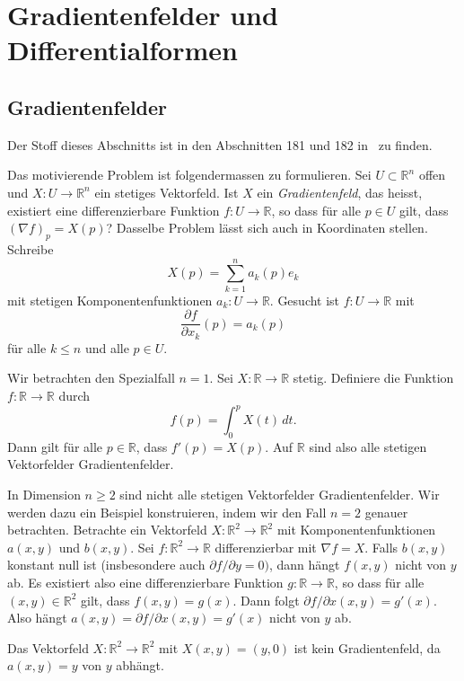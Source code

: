 \documentclass[../main.tex]{subfiles}
\begin{document}
\chapter{Gradientenfelder und Differentialformen}\label{chp:gradients}
\section{Gradientenfelder}
Der Stoff dieses Abschnitts ist in den
Abschnitten 181 und 182 in~\cite{heuser} zu finden.

Das motivierende Problem ist folgendermassen zu formulieren.
Sei $U \subset \mathbb{R}^n$ offen und
$X \colon U \to \mathbb{R}^n$ ein stetiges Vektorfeld.
Ist $X$ ein \emph{Gradientenfeld}, das heisst,
existiert
eine differenzierbare Funktion
$f \colon U \to \mathbb{R}$,
so dass für alle $p \in U$ gilt, dass ${(\nabla f)}_p = X(p)$?
Dasselbe Problem lässt sich auch in Koordinaten stellen.
Schreibe
\[
  X(p) = \sum_{k=1}^{n} a_k(p) e_k
\]
mit stetigen Komponentenfunktionen $a_k \colon U \to \mathbb{R}$.
Gesucht ist $f \colon U \to \mathbb{R}$ mit
\[
  \frac{\partial f}{\partial x_k} (p) = a_k(p)
\]
für alle
$k \leq n$ und alle $p \in U$.

\begin{specialcase}
  Wir betrachten den Spezialfall $n = 1$.
  Sei $X \colon \mathbb{R} \to \mathbb{R}$ stetig.
  Definiere die Funktion
  $f \colon \mathbb{R} \to \mathbb{R}$ 
  durch 
  \[
    f(p) = \int_{0}^{p} X(t) \, dt.
  \]
  Dann gilt für alle $p \in \mathbb{R}$,
  dass $f'(p) = X(p)$.
  Auf $\mathbb{R}$ sind also alle stetigen Vektorfelder Gradientenfelder.
\end{specialcase}

In Dimension $n \geq 2$ sind nicht alle stetigen
Vektorfelder Gradientenfelder.
Wir werden dazu ein Beispiel konstruieren, indem wir
den Fall $n = 2$ genauer betrachten.
Betrachte ein Vektorfeld $X \colon \mathbb{R}^2 \to \mathbb{R}^2$
mit Komponentenfunktionen $a(x, y)$ und $b(x, y)$.
Sei $f \colon \mathbb{R}^2 \to \mathbb{R}$ differenzierbar
mit $\nabla f = X$.
Falls $b(x, y)$ konstant null ist (insbesondere auch
$\partial f / \partial y = 0)$, dann hängt
$f(x, y)$ nicht von $y$ ab.
Es existiert also eine
differenzierbare Funktion
$g \colon \mathbb{R} \to \mathbb{R}$,
so dass für alle $(x, y) \in \mathbb{R}^2$ gilt,
dass $f(x, y) = g(x)$.
Dann folgt $\partial f / \partial x (x, y) = g'(x)$.
Also hängt $a(x, y) = \partial f / \partial x(x, y) = g'(x)$
nicht von $y$ ab.

\begin{example}
  Das Vektorfeld $X \colon \mathbb{R}^2 \to \mathbb{R}^2$ 
  mit $X(x, y) = (y, 0)$ ist kein Gradientenfeld,
  da $a(x, y) = y$ von $y$ abhängt.
\end{example}
\end{document}
